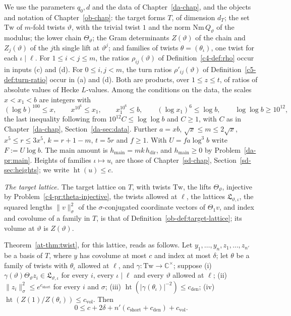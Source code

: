\documentclass[reqno]{amsart}
\newcounter{chap}
\theoremstyle{definition}
\theoremstyle{plain}
\newcommand{\C}{{\mathbb{C}}}
\newcommand{\Lc}{\mathfrak L}
\newcommand{\main}{h_{\mathrm{main}}}
\newcommand{\hdir}{h_{\mathrm{dir}}}
\newcommand{\hgt}{\operatorname{ht}}
\begin{document}
We use the parameters \(q_0,d\) and the data of Chapter~\ref{da-chap}, and the objects and notation of Chapter~\ref{ob-chap}: the target forms \(T\), of dimension \(d_T\); the set \(\mathrm{Tw}\) of \(m\)-fold twists \(\vartheta\), with the trivial twist \(1\) and the norm \(\mathrm{Nm}\,Q_\vartheta\) of the modulus; the lower chain \(\Theta_\vartheta\); the Gram determinants \(Z(\vartheta)\) of the chain and \(Z_j(\vartheta)\) of the \(j\)th single lift at \(\vartheta^j\); and families of twists \(\theta = (\theta_\iota)\), one twist for each \(\iota \mid \ell\).  For \(1 \le i < j \le m\), the ratios \(\rho_{ij}(\vartheta)\) of Definition~\ref{c4-def:rho} occur in inputs (c) and (d).  For \(0 \le i,j < m\), the turn ratios \(\rho'_{ij}(\vartheta)\) of Definition~\ref{c5-def:turn-ratio} occur in (a) and (d).  Both are products, over \(1 \le z \le t\), of ratios of absolute values of Hecke \(L\)-values.  Among the conditions on the data, the scales \(x < x_1 < b\) are integers with
\[
  (\log b)^{100} \le x , \qquad x^{10^6} \le x_1 , \qquad x_1^{10^6} \le b , \qquad (\log x_1)^6 \le \log b , \qquad \log\log b \ge 10^{12} ,
\]
the last inequality following from \(10^{12}C\le\log\log b\) and \(C\ge1\), with \(C\) as in Chapter~\ref{da-chap}, Section~\ref{da-sec:data}.  Further \(a = xb\), \(\sqrt x \le m \le 2\sqrt x\), \(x^5 \le r \le 3x^5\), \(k = r + 1 - m\), \(t = 5r\) and \(f \ge 1\).  With \(U = fa\log^3 b\) write \(F := U\log b\).  The main amount is \(\main = mk\,\hdir\), and \(\main \ge 0\) by Problem~\ref{da-pr:main}.  Heights of families \(\iota \mapsto u_\iota\) are those of Chapter~\ref{sd-chap}, Section~\ref{sd-sec:heights}; we write \(\hgt(u) \le c\).

\emph{The target lattice.}  The target lattice on \(T\), with twists \(\mathrm{Tw}\), the lifts \(\Theta_\vartheta\), injective by Problem~\ref{c4-pr:theta-injective}, the twists allowed at \(\ell\), the lattices \(\Lc_{\vartheta,\iota}\), the squared lengths \(\lVert v \rVert_\sigma^2\) of the \(\sigma\)-conjugated coordinate vectors of \(\Theta_1 v\), and index and covolume of a family in \(T\), is that of Definition~\ref{ob-def:target-lattice}; its volume at \(\vartheta\) is \(Z(\vartheta)\).

Theorem~\ref{at-thm:twist}, for this lattice, reads as follows.  Let \(y_1, \dots, y_n, z_1, \dots, z_{n'}\) be a basis of \(T\), where \(y\) has covolume at most \(c\) and index at most \(\delta\); let \(\theta\) be a family of twists with \(\theta_\iota\) allowed at \(\ell\), and \(\gamma \colon \mathrm{Tw} \to \C^\times\); suppose (i) \(\gamma(\vartheta)\Theta_\vartheta z_i \in \Lc_{\vartheta,\iota}\) for every \(i\), every \(\iota \mid \ell\) and every \(\vartheta\) allowed at \(\ell\); (ii) \(\lVert z_i \rVert_\sigma^2 \le e^{c_{\mathrm{short}}}\) for every \(i\) and \(\sigma\); (iii) \(\hgt(\lvert\gamma(\theta_\iota)\rvert^{-2}) \le c_{\mathrm{den}}\); (iv) \(\hgt(Z(1)/Z(\theta_\iota)) \le c_{\mathrm{vol}}\).  Then
\begin{equation}\label{eq:twist}
  0 \le c + 2\delta + n'(c_{\mathrm{short}} + c_{\mathrm{den}}) + c_{\mathrm{vol}} .
\end{equation}
\end{document}
